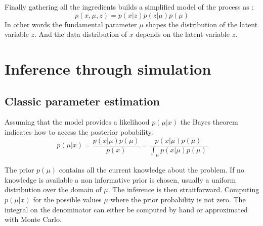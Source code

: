 Finally gathering all the ingredients builds a simplified model of the process as :
\begin{equation}
	\label{eq:model_simple}
	p(x, \mu, z) = p(x|z) p(z | \mu) p(\mu)
\end{equation}
In other words the fundamental parameter $\mu$ shapes the distribution of the latent variable $z$.
And the data distribution of $x$ depends on the latent variable $z$.







\section{Inference through simulation} %
\label{sec:inference_through_simulation}











\subsection{Classic parameter estimation} %
\label{sub:classic_parameter_estimation}



Assuming that the model provides a likelihood $p(\mu | x)$ the Bayes theorem indicates how to access the posterior pobability.
\begin{equation}	
    p(\mu | x) = \frac{p(x|\mu) p(\mu)}{p(x)} = \frac{p(x|\mu) p(\mu)}{\int_\mu p(x|\mu) p(\mu)}
\end{equation}

The prior $p(\mu)$ contains all the current knowledge about the problem. 
If no knowledge is available a non informative prior is chosen, usually a uniform distribution over the domain of $\mu$.
The inference is then straitforward.
Computing $p(\mu | x)$ for the possible values $\mu$ \ie where the prior probability is not zero.
The integral on the denominator can either be computed by hand or approximated with Monte Carlo.

